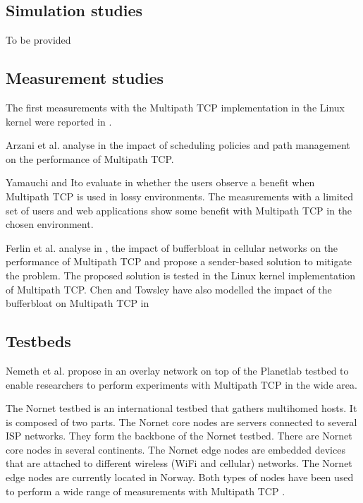 \subsection{Simulation studies}

To be provided

\subsection{Measurement studies}


The first measurements with the Multipath TCP implementation in the Linux kernel were reported in \cite{Barre_Multipath:2011}.


Arzani et al. analyse in \cite{Arzani_Impact:2014} the impact of scheduling policies and path management on the performance of Multipath TCP. 

Yamauchi and Ito evaluate in \cite{Yamauchi_Web:2014} whether the users observe a benefit when Multipath TCP is used in lossy environments. The measurements with a limited set of users and web applications show some benefit with Multipath TCP in the chosen environment.

Ferlin et al. analyse in \cite{Ferlin_Bufferbloat:2014}, the impact of bufferbloat in cellular networks on the performance of Multipath TCP and propose a sender-based solution to mitigate the problem. The proposed solution is tested in the Linux kernel implementation of Multipath TCP. Chen and Towsley have also modelled the impact of the bufferbloat on Multipath TCP in \cite{Chen_Bufferbloat:2014}

\subsection{Testbeds}

Nemeth et al. propose in \cite{Nemeth_Playground:2013} an overlay network on top of the Planetlab testbed to enable researchers to perform experiments with Multipath TCP in the wide area. 


The Nornet testbed \cite{Gunnar_Nornet:2014,Kvalbein_Nornet:2014} is an international testbed that gathers multihomed hosts. It is composed of two parts. The Nornet core nodes \cite{Gunnar_Nornet:2014} are servers connected to several ISP networks. They form the backbone of the Nornet testbed. There are Nornet core nodes in several continents. The Nornet edge nodes \cite{Kvalbein_Nornet:2014} are embedded devices that are attached to different wireless (WiFi and cellular) networks. The Nornet edge nodes are currently located in Norway. Both types of nodes have been used to perform a wide range of measurements with Multipath TCP \cite{draft-dreibholz-mptcp-nornet-experience}.
